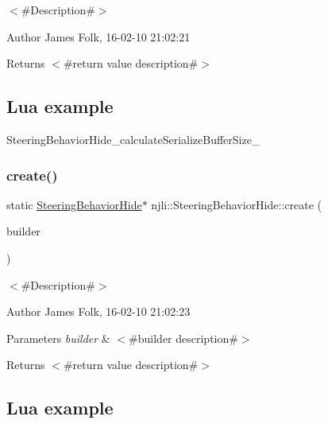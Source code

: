 $<$\#\+Description\#$>$ 

\begin{DoxyAuthor}{Author}
James Folk, 16-\/02-\/10 21\+:02\+:21
\end{DoxyAuthor}
\begin{DoxyReturn}{Returns}
$<$\#return value description\#$>$
\end{DoxyReturn}
\hypertarget{classnjli_1_1_steering_behavior_wander_ex1}{}\subsection{Lua example}\label{classnjli_1_1_steering_behavior_wander_ex1}

\begin{DoxyCodeInclude}
\end{DoxyCodeInclude}
Steering\+Behavior\+Hide\+\_\+calculate\+Serialize\+Buffer\+Size\+\_\+ \mbox{\label{classnjli_1_1_steering_behavior_hide_a21d37096b86b4f1917a70bca836ff005}} 
\subsubsection{\texorpdfstring{create()}{create()}\hspace{0.1cm}{\footnotesize\ttfamily [2/2]}}
{\footnotesize\ttfamily static \mbox{\hyperlink{classnjli_1_1_steering_behavior_hide}{Steering\+Behavior\+Hide}}$\ast$ njli\+::\+Steering\+Behavior\+Hide\+::create (\begin{DoxyParamCaption}\item[{const \mbox{\hyperlink{classnjli_1_1_steering_behavior_hide_builder}{Steering\+Behavior\+Hide\+Builder}} \&}]{builder }\end{DoxyParamCaption})\hspace{0.3cm}{\ttfamily [static]}}



$<$\#\+Description\#$>$ 

\begin{DoxyAuthor}{Author}
James Folk, 16-\/02-\/10 21\+:02\+:23
\end{DoxyAuthor}

\begin{DoxyParams}{Parameters}
{\em builder} & $<$\#builder description\#$>$\\
\hline
\end{DoxyParams}
\begin{DoxyReturn}{Returns}
$<$\#return value description\#$>$
\end{DoxyReturn}
\hypertarget{classnjli_1_1_steering_behavior_wander_ex1}{}\subsection{Lua example}\label{classnjli_1_1_steering_behavior_wander_ex1}

